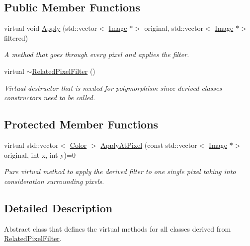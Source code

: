 \subsection*{Public Member Functions}
\begin{DoxyCompactItemize}
\item 
virtual void \hyperlink{classRelatedPixelFilter_a4f78d98d7f5ddc55f1e5e0f029b2bfbe}{Apply} (std\+::vector$<$ \hyperlink{classImage}{Image} $\ast$$>$ original, std\+::vector$<$ \hyperlink{classImage}{Image} $\ast$$>$ filtered)
\begin{DoxyCompactList}\small\item\em A method that goes through every pixel and applies the filter. \end{DoxyCompactList}\item 
\mbox{\label{classRelatedPixelFilter_afb57fae40e73094219014ab2ab393515}} 
virtual \hyperlink{classRelatedPixelFilter_afb57fae40e73094219014ab2ab393515}{$\sim$\+Related\+Pixel\+Filter} ()
\begin{DoxyCompactList}\small\item\em Virtual destructor that is needed for polymorphism since derived classes constructors need to be called. \end{DoxyCompactList}\end{DoxyCompactItemize}
\subsection*{Protected Member Functions}
\begin{DoxyCompactItemize}
\item 
virtual std\+::vector$<$ \hyperlink{classColor}{Color} $>$ \hyperlink{classRelatedPixelFilter_a4701695c3b2ca7fdcc41b3d03c5840df}{Apply\+At\+Pixel} (const std\+::vector$<$ \hyperlink{classImage}{Image} $\ast$$>$ original, int x, int y)=0
\begin{DoxyCompactList}\small\item\em Pure virtual method to apply the derived filter to one single pixel taking into consideration surrounding pixels. \end{DoxyCompactList}\end{DoxyCompactItemize}


\subsection{Detailed Description}
Abstract class that defines the virtual methods for all classes derived from \hyperlink{classRelatedPixelFilter}{Related\+Pixel\+Filter}. 

